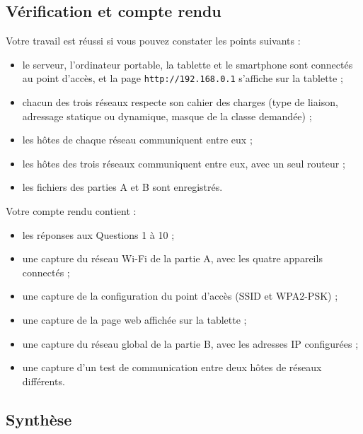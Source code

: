 \documentclass[
  french,
  10pt,
  a4paper,
]{scrartcl}
\providecommand{\tightlist}{%
  \setlength{\itemsep}{0pt}\setlength{\parskip}{0pt}}
\begin{document}
\subsection{Vérification et compte
rendu}\label{vuxe9rification-et-compte-rendu}

Votre travail est réussi si vous pouvez constater les points suivants :

\begin{itemize}
\tightlist
\item
  le serveur, l'ordinateur portable, la tablette et le smartphone sont
  connectés au point d'accès, et la page \texttt{http://192.168.0.1}
  s'affiche sur la tablette ;
\item
  chacun des trois réseaux respecte son cahier des charges (type de
  liaison, adressage statique ou dynamique, masque de la classe
  demandée) ;
\item
  les hôtes de chaque réseau communiquent entre eux ;
\item
  les hôtes des trois réseaux communiquent entre eux, avec un seul
  routeur ;
\item
  les fichiers des parties A et B sont enregistrés.
\end{itemize}

Votre compte rendu contient :

\begin{itemize}
\tightlist
\item
  les réponses aux Questions 1 à 10 ;
\item
  une capture du réseau Wi-Fi de la partie A, avec les quatre appareils
  connectés ;
\item
  une capture de la configuration du point d'accès (SSID et WPA2-PSK) ;
\item
  une capture de la page web affichée sur la tablette ;
\item
  une capture du réseau global de la partie B, avec les adresses IP
  configurées ;
\item
  une capture d'un test de communication entre deux hôtes de réseaux
  différents.
\end{itemize}

\subsection{Synthèse}\label{synthuxe8se}
\end{document}
